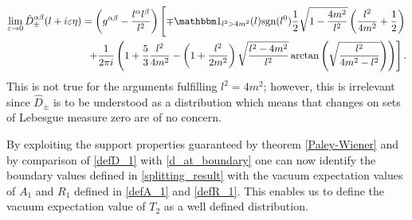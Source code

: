 \documentclass[b5paper,draft,openbib,12pt]{memoir}
\newcommand{\id}{{\mathbbm 1}}
\begin{document}
\begin{equation}\label{splitting_result}
\begin{aligned}
\lim_{\varepsilon \rightarrow 0} \hat{D}^{\alpha \beta}_{\pm}(l+i\varepsilon \eta)
= \left(g^{\alpha \beta} - \frac{l^{\alpha} l^{\beta}}{l^2}\right)\left[ \mp \id_{l^2>4m^2}(l) \text{sgn}(l^0) \frac{1}{2}\sqrt{1-  \frac{4m^2}{l^2}} \left( \frac{l^2}{4m^2}+\frac{1}{2}\right)  \right. \\
\left.  +\frac{1}{2\pi i}\left( 1+\frac{5}{3} \frac{l^2}{4m^2}-\left(1+ \frac{l^2} {2m^2}\right)\sqrt{\frac{l^2-4m^2}{l^2}}\arctan \left( \sqrt{\frac{l^2}{4m^2-l^2}} \right)\right)   \right].
\end{aligned}
\end{equation}
This is not true for the arguments fulfilling \(l^2=4m^2\); however, this is irrelevant since \(\hat{D}_{\pm}\) is to be understood as a distribution which means that changes on sets of Lebesgue measure zero are of no concern.


By exploiting the support properties guaranteed by theorem \ref{Paley-Wiener} and by comparison of \eqref{defD_1} with \eqref{d_at_boundary} one can now identify the boundary values defined in \eqref{splitting_result} with the vacuum expectation values of \(A_1\) and \(R_1\) defined in \eqref{defA_1} and \eqref{defR_1}.
This enables us to define the vacuum expectation value of \(T_2\) as a well defined distribution.
\end{document}
